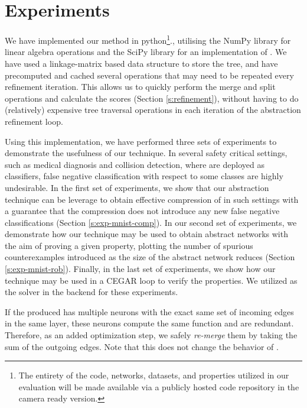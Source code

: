 \section{Experiments} 

We have implemented our method in python\footnote{The entirety of the code,
    networks, datasets, and properties utilized in our evaluation will be made
    available via a publicly hosted code repository in the
camera ready version.}., utilising the NumPy \cite{numpy}
library for linear algebra operations and the SciPy \cite{scipy} library for an
implementation of \hcluster.
We have used a linkage-matrix \cite{scipy-hcluster-linkage}  based
data structure to store the tree, and have precomputed and cached several
operations that may need to be repeated every refinement iteration. This allows
us to quickly perform the merge and split operations and calculate the
scores (Section \ref{s:refinement}), without having to do (relatively)
expensive tree traversal operations in each iteration of the abstraction
refinement loop. 

Using this implementation, we have performed three sets of experiments to
demonstrate the usefulness of our technique. In several safety critical
settings, such as medical diagnosis and collision detection, where \dnn are
deployed as classifiers, false negative classification with respect to some
classes are highly undesirable. In the first set of experiments, we show that
our abstraction technique can be leverage to obtain effective compression of
\dnn in such settings with a guarantee that the compression does not introduce
any new false negative classifications (Section \ref{s:exp-mnist-comp}). In our
second set of experiments, we demonstrate how our technique may be used to
obtain abstract networks with the aim of proving a given property, plotting the
number of spurious counterexamples introduced as the size of the abstract
network reduces (Section \ref{s:exp-mnist-rob}). Finally, in the last set of
experiments, we show how our technique may be used in a CEGAR loop
\cite{cegar-nn} to verify the \acasxu properties. We utilized \abcrown as the 
solver in the backend for these experiments. 

If the \abs produced has multiple neurons with the exact same set of incoming
edges in the same layer, these neurons compute the same function and are
redundant. Therefore, as an added optimization step, we safely \textit{re-merge}
them by taking the sum of the outgoing edges. Note that this does not change the
behavior of \abs.

